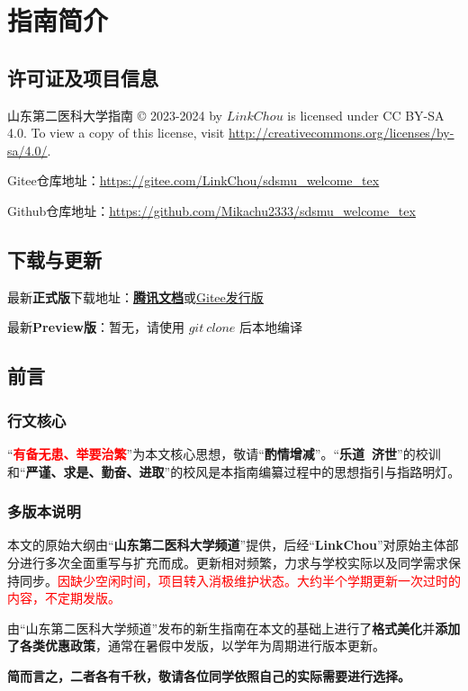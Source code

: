 \chapter[指南简介]{指南简介}

\section[许可证及项目信息]{许可证及项目信息}
山东第二医科大学指南 © 2023-2024 by $LinkChou$ is licensed under CC BY-SA 4.0. To view a copy of this license, visit \uline{\href{http://creativecommons.org/licenses/by-sa/4.0/}{http://creativecommons.org/licenses/by-sa/4.0/}}.

Gitee仓库地址：\uline{\href{https://gitee.com/LinkChou/sdsmu_welcome_tex}{https://gitee.com/LinkChou/sdsmu\_welcome\_tex}}

Github仓库地址：\uline{\href{https://github.com/Mikachu2333/sdsmu_welcome_tex}{https://github.com/Mikachu2333/sdsmu\_welcome\_tex}}

\section[\textcolor{red}{下载与更新}]{下载与更新}
最新\textbf{正式版}下载地址：\textbf{\uline{\textcolor{red}{\href{https://docs.qq.com/s/ETcQ-ZFSrSsh6MK9bm773q}{腾讯文档}}}}或\uline{\href{https://gitee.com/LinkChou/sdsmu_welcome_tex/releases/latest}{Gitee发行版}}

最新\textbf{Preview版}\footnotemark：暂无，请使用 $git\ clone$ 后本地编译

\section[前言]{前言}
\subsection[行文核心]{行文核心}
“\textcolor{red}{\textbf{有备无患、举要治繁}}”为本文核心思想，敬请“\textbf{酌情增减}”。“\textbf{乐道\ 济世}”的校训和“\textbf{严谨、求是、勤奋、进取}”的校风是本指南编纂过程中的思想指引与指路明灯。

\subsection[多版本说明]{多版本说明}
本文的原始大纲由“\textbf{山东第二医科大学频道}”提供，后经“\textbf{LinkChou}”对原始主体部分进行多次全面重写与扩充而成。更新相对频繁，力求与学校实际以及同学需求保持同步。\textcolor{red}{因缺少空闲时间，项目转入消极维护状态。大约半个学期更新一次过时的内容，不定期发版。}

由“山东第二医科大学频道”发布的新生指南在本文的基础上进行了\textbf{格式美化}并\textbf{添加了各类优惠政策}，通常在暑假中发版，以学年为周期进行版本更新。

\textbf{简而言之，二者各有千秋，敬请各位同学依照自己的实际需要进行选择。}
